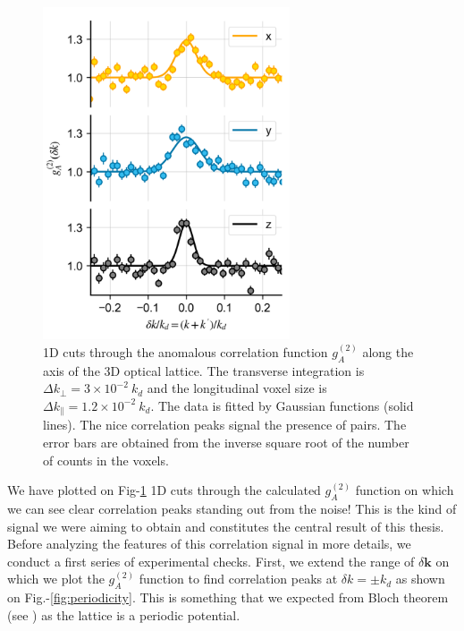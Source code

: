 \begin{figure}[ht!]
    \centering
    \includegraphics[width=0.65\textwidth]{Fig/Chapter4/correlations_kmk_errorbars.png}
    \caption{1D cuts through the anomalous correlation function $g_{A}^{(2)}$ along the axis of the 3D optical lattice. The transverse integration is $\Delta k_{\perp}=3 \times 10^{-2} \ k_d$ and the longitudinal voxel size is $\Delta k_{\parallel}=1.2 \times 10^{-2} \ k_d$. The data is fitted by Gaussian functions (solid lines). The nice correlation peaks signal the presence of \kmk pairs. The error bars are obtained from the inverse square root of the number of counts in the voxels.}
    \label{fig:kmk_signal}
\end{figure}

We have plotted on Fig-\ref{fig:kmk_signal} 1D cuts through the calculated $g_{A}^{(2)}$ function on which we can see clear correlation peaks standing out from the noise! This is the kind of signal we were aiming to obtain and constitutes the central result of this thesis. Before analyzing the features of this correlation signal in more details, we conduct a first series of experimental checks. First, we extend the range of $\delta \bm{k}$ on which we plot the $g_{A}^{(2)}$ function to find correlation peaks at $\delta k = \pm k_d$ as shown on Fig.-\ref{fig:periodicity}. This is something that we expected from Bloch theorem (see ) as the lattice is a periodic potential.

